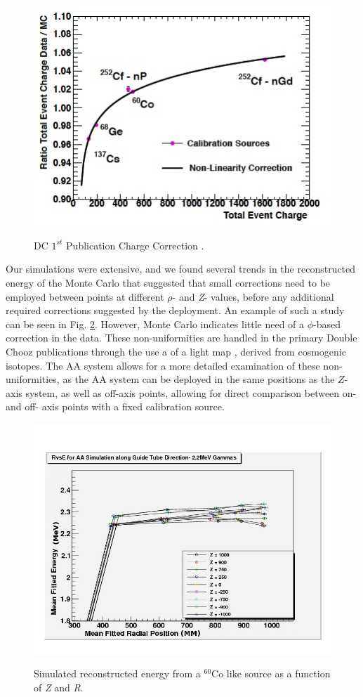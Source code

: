 \begin{figure}
\caption{DC $1^{st}$ Publication Charge Correction \cite{DC_2012}.}
\includegraphics{AA/Igor_Energy_Correction.jpg}
\label{Igor Energy}
\end{figure}

Our simulations were extensive, and we found several trends in the reconstructed energy of the Monte Carlo that suggested that small corrections need to be employed between points at different $\rho$- and \emph{Z}- values, before any additional required corrections suggested by the deployment. An example of such a study can be seen in Fig. \ref{R vs E Co}. However, Monte Carlo indicates little need of a $\phi$-based correction in the data. These non-uniformities are handled in the primary Double Chooz publications through the use a of a light map \cite{DC_2013}, derived from cosmogenic isotopes. The AA system allows for a more detailed examination of these non-uniformities, as the AA system can be deployed in the same positions as the $Z$-axis system, as well as off-axis points, allowing for direct comparison between on- and off- axis points with a fixed calibration source. 

\begin{figure}
\caption{Simulated reconstructed energy from a $^{60}$Co like source as a function of \emph{Z} and \emph{R}.}
\includegraphics[width=\textwidth]{AA/R_vs_E_Co_60_Sim.jpg}
\label{R vs E Co}
\end{figure} 




